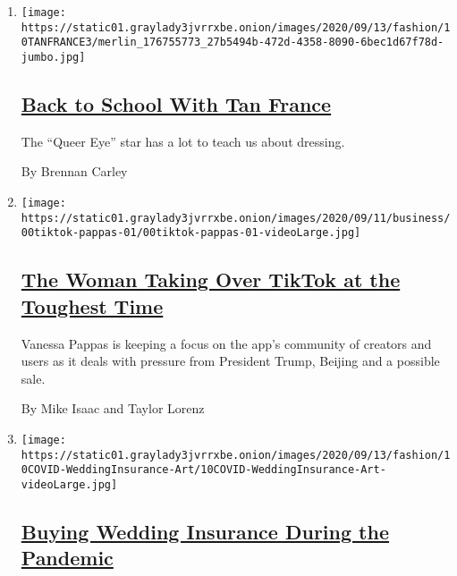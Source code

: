 \begin{enumerate}
\def\labelenumi{\arabic{enumi}.}
\item
  \texttt{[image: https://static01.graylady3jvrrxbe.onion/images/2020/09/13/fashion/10TANFRANCE3/merlin\_176755773\_27b5494b-472d-4358-8090-6bec1d67f78d-jumbo.jpg]}

  \hypertarget{back-to-school-with-tan-france}{%
  \subsection{\texorpdfstring{\href{/2020/09/11/style/tan-france-queer-eye-masterclass.html}{Back
  to School With Tan
  France}}{Back to School With Tan France}}\label{back-to-school-with-tan-france}}

  The ``Queer Eye'' star has a lot to teach us about dressing.

  By Brennan Carley
\item
  \texttt{[image: https://static01.graylady3jvrrxbe.onion/images/2020/09/11/business/00tiktok-pappas-01/00tiktok-pappas-01-videoLarge.jpg]}

  \hypertarget{the-woman-taking-over-tiktok-at-the-toughest-time}{%
  \subsection{\texorpdfstring{\href{/2020/09/11/technology/tiktok-vanessa-pappas-bytedance.html}{The
  Woman Taking Over TikTok at the Toughest
  Time}}{The Woman Taking Over TikTok at the Toughest Time}}\label{the-woman-taking-over-tiktok-at-the-toughest-time}}

  Vanessa Pappas is keeping a focus on the app's community of creators
  and users as it deals with pressure from President Trump, Beijing and
  a possible sale.

  By Mike Isaac and Taylor Lorenz
\item
  \texttt{[image: https://static01.graylady3jvrrxbe.onion/images/2020/09/13/fashion/10COVID-WeddingInsurance-Art/10COVID-WeddingInsurance-Art-videoLarge.jpg]}

  \hypertarget{buying-wedding-insurance-during-the-pandemic}{%
  \subsection{\texorpdfstring{\href{/2020/09/10/fashion/weddings/buying-wedding-insurance-during-covid-pandemic.html}{Buying
  Wedding Insurance During the
  Pandemic}}{Buying Wedding Insurance During the Pandemic}}\label{buying-wedding-insurance-during-the-pandemic}}


\end{enumerate}
